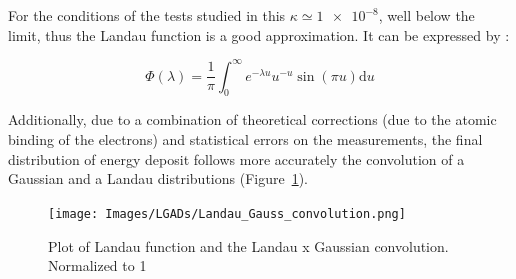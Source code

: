 For the conditions of the tests studied in this  $\kappa\simeq \num{1e-8}$, well below the limit, thus the Landau function is a good approximation. It can be expressed by \cite{KOLBIG198497}:

\begin{equation}\label{eq:landau}
    \Phi (\lambda) = \frac{1}{\pi} \int_{0}^{\infty} e^{-\lambda u} u^{-u} \sin (\pi u ) \mathrm{d}u
\end{equation}

Additionally, due to a combination of theoretical corrections \cite{PhysRevA.11.1286} (due to the atomic binding of the electrons) and statistical errors on the measurements, the final distribution of energy deposit follows more accurately the convolution of a Gaussian and a Landau distributions (Figure~\ref{fig:langau_convolution_plot}).

\begin{figure}
    \centering
    \texttt{[image: Images/LGADs/Landau\_Gauss\_convolution.png]}
    \captionsetup{width=.8\linewidth}
    \caption{Plot of Landau function and the Landau x Gaussian convolution. Normalized to 1}
    \label{fig:langau_convolution_plot}
\end{figure}

                 